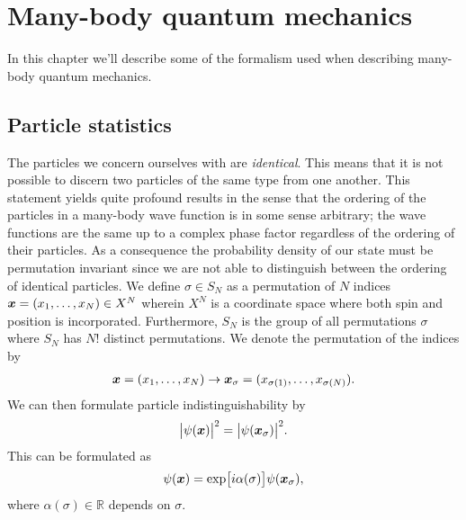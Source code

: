 \chapter{Many-body quantum mechanics}
    In this chapter we'll describe some of the formalism used when describing
    many-body quantum mechanics.

    \section{Particle statistics}
        The particles we concern ourselves with are \emph{identical}.
        This means that it is not possible to discern two particles of the
        same type from one another.
        This statement yields quite profound results in the sense that the
        ordering of the particles in a many-body wave function is in some sense
        arbitrary; the wave functions are the same up to a complex phase factor
        regardless of the ordering of their particles.
        As a consequence the probability density of our state must be
        permutation invariant since we are not able to distinguish between the
        ordering of identical particles.
        We define $\sigma \in S_{N}$ as a permutation of $N$ indices $\boldsymbol{x}
        = (x_1, \dots, x_N) \in X^{N}$ wherein $X^N$ is a coordinate space where
        both spin and position is incorporated.
        Furthermore, $S_{N}$ is the group of all permutations $\sigma$ where
        $S_{N}$ has $N!$ distinct permutations.
        We denote the permutation of the indices by
        \begin{align}
            \boldsymbol{x} = (x_1, \dots, x_N)
            \to \boldsymbol{x}_{\sigma} = (x_{\sigma(1)}, \dots, x_{\sigma(N)}).
            \label{eq:permutation-indices}
        \end{align}
        We can then formulate particle indistinguishability by
        \cite{leinaas1977, kvaal2017notes}
        \begin{align}
            \abs{
                \psi(\boldsymbol{x})
            }^2
            = \abs{
                \psi(\boldsymbol{x}_{\sigma})
            }^2.
            \label{eq:particle-indistinguishability}
        \end{align}
        This can be formulated as \cite{kvaal2017notes}
        \begin{align}
            \psi(\boldsymbol{x}) = \exp[i\alpha(\sigma)] \psi(\boldsymbol{x}_{\sigma}),
        \end{align}
        where $\alpha(\sigma) \in \mathbb{R}$ depends on $\sigma$.
